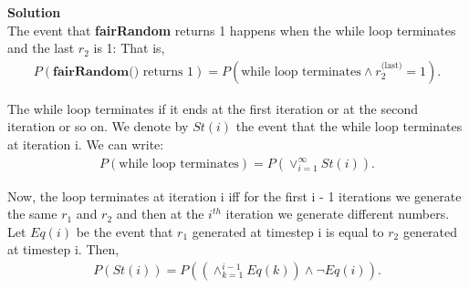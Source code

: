 \documentclass[10pt,a4paper,oneside,draft]{report}
\begin{document}
\textbf{Solution} \\
The event that \textbf{fairRandom} returns 1 happens when the while loop terminates and the last $r_2$ is 1: That is,
\begin{gather*}
P(\textbf{fairRandom() } \text{returns 1}) =  P(\text{while loop terminates} \land r_2^{\text{(last)}} = 1).
\end{gather*}

The while loop terminates if it ends at the first iteration or at the second iteration or so on. We denote by $St(i)$ the event that the while loop terminates at iteration i. We can write:
\begin{gather*}
P(\text{while loop terminates}) = P(\lor_{i=1}^{\infty} St(i)).
\end{gather*}

Now, the loop terminates at iteration i iff for the first i - 1 iterations we generate the same $r_1$ and $r_2$ and then at the $i^{th}$ iteration we generate different numbers. Let $Eq(i)$ be the event that $r_1$ generated at timestep i is equal to $r_2$ generated at timestep i. Then, 
\begin{gather*}
P(St(i)) = P((\land_{k=1}^{i-1} Eq(k)) \land \neg Eq(i)).
\end{gather*}
\end{document}
